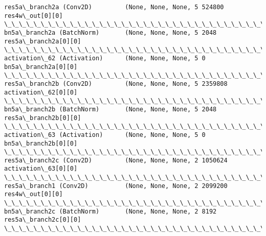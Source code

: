 \documentclass[11pt]{article}
\begin{document}
\begin{Verbatim}[commandchars=\\\{\}]
res5a\_branch2a (Conv2D)         (None, None, None, 5 524800      res4w\_out[0][0]                  
\_\_\_\_\_\_\_\_\_\_\_\_\_\_\_\_\_\_\_\_\_\_\_\_\_\_\_\_\_\_\_\_\_\_\_\_\_\_\_\_\_\_\_\_\_\_\_\_\_\_\_\_\_\_\_\_\_\_\_\_\_\_\_\_\_\_\_\_\_\_\_\_\_\_\_\_\_\_\_\_\_\_\_\_\_\_\_\_\_\_\_\_\_\_\_\_\_\_
bn5a\_branch2a (BatchNorm)       (None, None, None, 5 2048        res5a\_branch2a[0][0]             
\_\_\_\_\_\_\_\_\_\_\_\_\_\_\_\_\_\_\_\_\_\_\_\_\_\_\_\_\_\_\_\_\_\_\_\_\_\_\_\_\_\_\_\_\_\_\_\_\_\_\_\_\_\_\_\_\_\_\_\_\_\_\_\_\_\_\_\_\_\_\_\_\_\_\_\_\_\_\_\_\_\_\_\_\_\_\_\_\_\_\_\_\_\_\_\_\_\_
activation\_62 (Activation)      (None, None, None, 5 0           bn5a\_branch2a[0][0]              
\_\_\_\_\_\_\_\_\_\_\_\_\_\_\_\_\_\_\_\_\_\_\_\_\_\_\_\_\_\_\_\_\_\_\_\_\_\_\_\_\_\_\_\_\_\_\_\_\_\_\_\_\_\_\_\_\_\_\_\_\_\_\_\_\_\_\_\_\_\_\_\_\_\_\_\_\_\_\_\_\_\_\_\_\_\_\_\_\_\_\_\_\_\_\_\_\_\_
res5a\_branch2b (Conv2D)         (None, None, None, 5 2359808     activation\_62[0][0]              
\_\_\_\_\_\_\_\_\_\_\_\_\_\_\_\_\_\_\_\_\_\_\_\_\_\_\_\_\_\_\_\_\_\_\_\_\_\_\_\_\_\_\_\_\_\_\_\_\_\_\_\_\_\_\_\_\_\_\_\_\_\_\_\_\_\_\_\_\_\_\_\_\_\_\_\_\_\_\_\_\_\_\_\_\_\_\_\_\_\_\_\_\_\_\_\_\_\_
bn5a\_branch2b (BatchNorm)       (None, None, None, 5 2048        res5a\_branch2b[0][0]             
\_\_\_\_\_\_\_\_\_\_\_\_\_\_\_\_\_\_\_\_\_\_\_\_\_\_\_\_\_\_\_\_\_\_\_\_\_\_\_\_\_\_\_\_\_\_\_\_\_\_\_\_\_\_\_\_\_\_\_\_\_\_\_\_\_\_\_\_\_\_\_\_\_\_\_\_\_\_\_\_\_\_\_\_\_\_\_\_\_\_\_\_\_\_\_\_\_\_
activation\_63 (Activation)      (None, None, None, 5 0           bn5a\_branch2b[0][0]              
\_\_\_\_\_\_\_\_\_\_\_\_\_\_\_\_\_\_\_\_\_\_\_\_\_\_\_\_\_\_\_\_\_\_\_\_\_\_\_\_\_\_\_\_\_\_\_\_\_\_\_\_\_\_\_\_\_\_\_\_\_\_\_\_\_\_\_\_\_\_\_\_\_\_\_\_\_\_\_\_\_\_\_\_\_\_\_\_\_\_\_\_\_\_\_\_\_\_
res5a\_branch2c (Conv2D)         (None, None, None, 2 1050624     activation\_63[0][0]              
\_\_\_\_\_\_\_\_\_\_\_\_\_\_\_\_\_\_\_\_\_\_\_\_\_\_\_\_\_\_\_\_\_\_\_\_\_\_\_\_\_\_\_\_\_\_\_\_\_\_\_\_\_\_\_\_\_\_\_\_\_\_\_\_\_\_\_\_\_\_\_\_\_\_\_\_\_\_\_\_\_\_\_\_\_\_\_\_\_\_\_\_\_\_\_\_\_\_
res5a\_branch1 (Conv2D)          (None, None, None, 2 2099200     res4w\_out[0][0]                  
\_\_\_\_\_\_\_\_\_\_\_\_\_\_\_\_\_\_\_\_\_\_\_\_\_\_\_\_\_\_\_\_\_\_\_\_\_\_\_\_\_\_\_\_\_\_\_\_\_\_\_\_\_\_\_\_\_\_\_\_\_\_\_\_\_\_\_\_\_\_\_\_\_\_\_\_\_\_\_\_\_\_\_\_\_\_\_\_\_\_\_\_\_\_\_\_\_\_
bn5a\_branch2c (BatchNorm)       (None, None, None, 2 8192        res5a\_branch2c[0][0]             
\_\_\_\_\_\_\_\_\_\_\_\_\_\_\_\_\_\_\_\_\_\_\_\_\_\_\_\_\_\_\_\_\_\_\_\_\_\_\_\_\_\_\_\_\_\_\_\_\_\_\_\_\_\_\_\_\_\_\_\_\_\_\_\_\_\_\_\_\_\_\_\_\_\_\_\_\_\_\_\_\_\_\_\_\_\_\_\_\_\_\_\_\_\_\_\_\_\_

\end{Verbatim}
\end{document}
